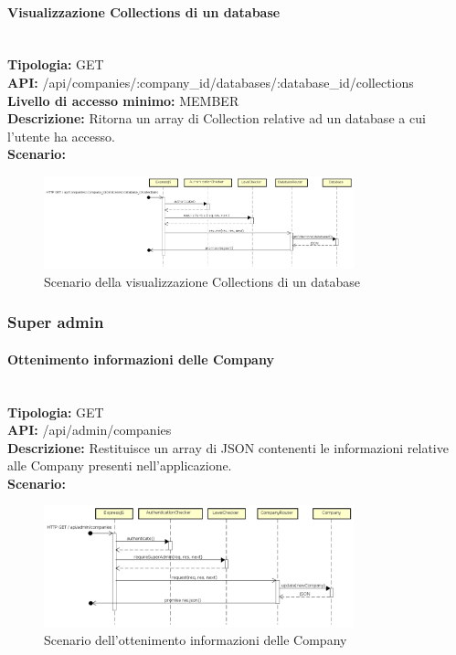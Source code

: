 \newpage
\paragraph{Visualizzazione Collections di un database} \mbox{}\\
\textbf{Tipologia:} GET \\
\textbf{API:} /api/companies/:company\_id/databases/:database\_id/collections \\
\textbf{Livello di accesso minimo:} MEMBER \\
\textbf{Descrizione:} Ritorna un array di Collection relative ad un database a cui l'utente ha accesso. \\
\textbf{Scenario:} 
\begin{figure}[H]
\centering
\includegraphics[width=0.8\textwidth]{res/sections/backend/sequence/(GET)collection.png}
\caption{Scenario della visualizzazione Collections di un database}
\end{figure}

\newpage
\subsubsection{Super admin}
\paragraph{Ottenimento informazioni delle Company}\mbox{}\\
\textbf{Tipologia:} GET \\
\textbf{API:} /api/admin/companies \\
\textbf{Descrizione:} Restituisce un array di JSON contenenti le informazioni relative alle Company presenti nell'applicazione. \\
\textbf{Scenario:} 
\begin{figure}[H]
\centering
\includegraphics[width=0.8\textwidth]{res/sections/backend/sequence/(GET)companySA.png}
\caption{Scenario dell'ottenimento informazioni delle Company}
\end{figure}

